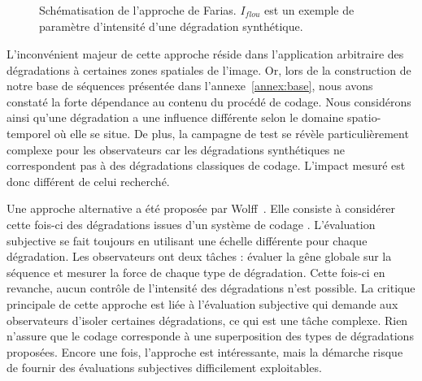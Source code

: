 \begin{figure}[htbp]
	\centering
	\caption{Schématisation de l'approche de Farias. $I_{\mathit{flou}}$ est un exemple de paramètre d'intensité d'une dégradation synthétique.}
	\label{fig:approcheFarias}
\end{figure}

L'inconvénient majeur de cette approche réside dans l'application arbitraire des dégradations à certaines zones spatiales de l'image. Or, lors de la construction de notre base de séquences présentée dans l'annexe~\ref{annex:base}, nous avons constaté la forte dépendance au contenu du procédé de codage. Nous considérons ainsi qu'une dégradation a une influence différente selon le domaine spatio-temporel où elle se situe. De plus, la campagne de test se révèle particulièrement complexe pour les observateurs car les dégradations synthétiques ne correspondent pas à des dégradations classiques de codage. L'impact mesuré est donc différent de celui recherché.

Une approche alternative a été proposée par Wolff~\cite{eusipco2006-wolff}. Elle consiste à considérer cette fois-ci des dégradations issues d'un système de codage \avc. L'évaluation subjective se fait toujours en utilisant une échelle différente pour chaque dégradation. Les observateurs ont deux tâches : évaluer la gêne globale sur la séquence et mesurer la force de chaque type de dégradation. Cette fois-ci en revanche, aucun contrôle de l'intensité des dégradations n'est possible. La critique principale de cette approche est liée à l'évaluation subjective qui demande aux observateurs d'isoler certaines dégradations, ce qui est une tâche complexe. Rien n'assure que le codage corresponde à une superposition des types de dégradations proposées. Encore une fois, l'approche est intéressante, mais la démarche risque de fournir des évaluations subjectives difficilement exploitables.


